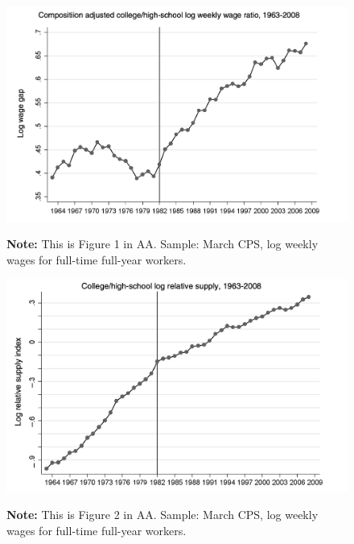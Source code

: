 \documentclass[11pt, aspectratio=169]{beamer}
\begin{document}
\begin{frame}{}
	\begin{figure}
		\includegraphics[scale=0.35]{./figures/inequality_wage_10}
	\vspace*{-2mm}
	\begin{flushleft}
		{\scriptsize \hspace{6mm} \textbf{Note:} This is Figure 1 in AA. Sample: March CPS, log weekly wages for full-time full-year workers.}
	\end{flushleft}	
	\end{figure}
\end{frame}


\begin{frame}{}
	\begin{figure}
		\includegraphics[scale=0.35]{./figures/inequality_wage_11}
	\vspace*{-2mm}
	\begin{flushleft}
		{\scriptsize \hspace{6mm} \textbf{Note:} This is Figure 2 in AA. Sample: March CPS, log weekly wages for full-time full-year workers.}
	\end{flushleft}	
	\end{figure}
\end{frame}
\end{document}

